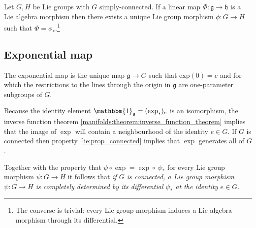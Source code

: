 	\begin{property}\label{lie:prop_hom}
		Let $G, H$ be Lie groups with $G$ simply-connected. If a linear map $\Phi:\mathfrak{g}\rightarrow\mathfrak{h}$ is a Lie algebra morphism then there exists a unique Lie group morphism $\phi:G\rightarrow H$ such that $\Phi = \phi_*$.\footnote{The converse is trivial: every Lie group morphism induces a Lie algebra morphism through its differential.}
	\end{property}

\subsection{Exponential map}
	
	\begin{property}
		The exponential map is the unique map $\mathfrak{g}\rightarrow G$ such that exp$(0) = e$ and for which the restrictions to the lines through the origin in $\mathfrak{g}$ are one-parameter subgroups of $G$.
	\end{property}
	\begin{result}\label{lie:exp_result}
		Because the identity element $\mathbbm{1}_\mathfrak{g} = (\exp_\ast)_e$ is an isomorphism, the inverse function theorem \ref{manifolds:theorem:inverse_function_theorem} implies that the image of $\exp$ will contain a neighbourhood of the identity $e\in G$. If $G$ is connected then property \ref{lie:prop_connected} implies that $\exp$ generates all of $G$.
		
		Together with the property that $\psi\circ\exp = \exp\circ\ \psi_\ast$ for every Lie group morphism $\psi:G\rightarrow H$ it follows that \textit{if $G$ is connected, a Lie group morphism $\psi:G\rightarrow H$ is completely determined by its differential $\psi_\ast$ at the identity $e\in G$}.
	\end{result}
	
